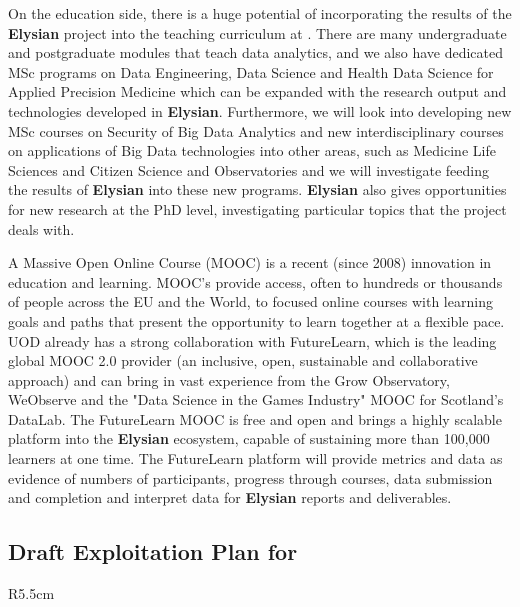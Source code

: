 \documentclass[a4paper,11pt]{article}
\newcommand{\project}[1]{\textbf{#1}\xspace}
\newcommand{\SECURITY}{\project{Elysian}}
\newcommand{\TheProject}{\SECURITY}
\begin{document}
On the education side, there is a huge potential of incorporating the results of the \TheProject{} project into the teaching curriculum at \UOD. There are many undergraduate and postgraduate modules that teach data analytics, and we also have dedicated MSc programs on Data Engineering, Data Science and Health Data Science for Applied Precision Medicine which can be expanded with the research output and technologies developed in \TheProject{}. Furthermore, we will look into developing new MSc courses on Security of Big Data Analytics and new interdisciplinary courses on applications of Big Data technologies into other areas, such as Medicine Life Sciences and Citizen Science and Observatories and we will investigate feeding the results of \TheProject{} into these new programs. \TheProject{} also gives opportunities for new research at the PhD level, investigating particular topics that the project deals with.



A Massive Open Online Course (MOOC)
is a recent (since 2008) innovation in education and learning. MOOC’s provide access, often to hundreds or thousands of people across the EU and the World, to focused online courses with learning goals and paths that present the opportunity to learn together at a flexible pace. UOD already has a strong collaboration with FutureLearn, which is the leading global MOOC 2.0 provider (an inclusive, open, sustainable and collaborative approach)  and can bring in vast experience from the Grow Observatory, WeObserve and the "Data Science in the Games Industry" MOOC for Scotland's DataLab.  The FutureLearn MOOC is free and open and brings a highly scalable platform into the \TheProject{} 
ecosystem, capable of sustaining more than 100,000 learners at one time. The FutureLearn platform will provide metrics and data as evidence of numbers of participants, progress through courses, data submission and completion and interpret data for \TheProject{} reports and deliverables.


\horizontalline

\subsection*{Draft Exploitation Plan for \UCMshort{}}

\begin{wrapfigure}{R}{5.5cm}
\vspace{-1cm}
\hfill {}
\vspace{-0.9cm}
\end{wrapfigure}
\end{document}
